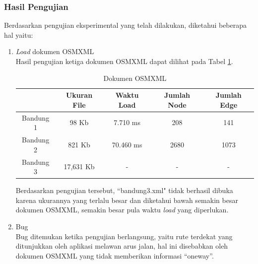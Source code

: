\subsubsection{Hasil Pengujian}
Berdasarkan pengujian eksperimental yang telah dilakukan, diketahui beberapa hal
yaitu:
\begin{enumerate}
  \item \textit{Load} dokumen OSMXML\\
  Hasil pengujian ketiga dokumen OSMXML dapat dilihat pada Tabel
  \ref{tab:doc_xml}.
\begin{table}[h]
\centering
\caption{Dokumen OSMXML} 
\label{tab:doc_xml}
\begin{tabular}{|c|c|c|c|c|}
\hline
          & Ukuran File & Waktu Load & Jumlah Node & Jumlah Edge \\ \hline
Bandung 1 & 98 Kb       & 7.710 ms   & 208         & 141         \\ \hline
Bandung 2 & 821 Kb      & 70.460 ms  & 2680        & 1073        \\ \hline
Bandung 3 & 17,631 Kb   & -          & -           & -           \\ \hline
\end{tabular}
\end{table}

  Berdasarkan pengujian tersebut, ``bandung3.xml" tidak berhasil dibuka
  karena ukurannya yang terlalu besar dan diketahui bawah semakin besar dokumen
  OSMXML, semakin besar pula waktu \textit{load} yang diperlukan.
  
  \item Bug\\
  Bug ditemukan ketika pengujian berlangsung, yaitu rute terdekat yang
  ditunjukkan oleh aplikasi melawan arus jalan, hal ini disebabkan oleh dokumen
  OSMXML yang tidak memberikan informasi ``oneway''.
\end{enumerate}












